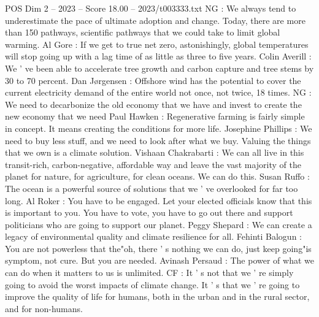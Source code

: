 \begin{textsample}{POS Dim 2 – 2023 – Score 18.00 – 2023/t003333.txt}
NG : We always tend to underestimate the pace of ultimate adoption and change.
Today, there are more than 150 pathways, scientific pathways that we could take to limit global warming.
Al Gore : If we get to true net zero, astonishingly, global temperatures will stop going up with a lag time of as little as three to five years.
Colin Averill : We ' ve been able to accelerate tree growth and carbon capture and tree stems by 30 to 70 percent.
Dan Jørgensen : Offshore wind has the potential to cover the current electricity demand of the entire world not once, not twice, 18 times.
NG : We need to decarbonize the old economy that we have and invest to create the new economy that we need Paul Hawken : Regenerative farming is fairly simple in concept.
It means creating the conditions for more life.
Josephine Phillips : We need to buy less stuff, and we need to look after what we buy.
Valuing the things that we own is a climate solution.
Vishaan Chakrabarti : We can all live in this transit-rich, carbon-negative, affordable way and leave the vast majority of the planet for nature, for agriculture, for clean oceans.
We can do this.
Susan Ruffo : The ocean is a powerful source of solutions that we ' ve overlooked for far too long.
Al Roker : You have to be engaged.
Let your elected officials know that this is important to you.
You have to vote, you have to go out there and support politicians who are going to support our planet.
Peggy Shepard : We can create a legacy of environmental quality and climate resilience for all.
Fehinti Balogun : You are not powerless that the"oh, there ' s nothing we can do, just keep going"is symptom, not cure.
But you are needed.
Avinash Persaud : The power of what we can do when it matters to us is unlimited.
CF : It ' s not that we ' re simply going to avoid the worst impacts of climate change.
It ' s that we ' re going to improve the quality of life for humans, both in the urban and in the rural sector, and for non-humans.

\end{textsample}

